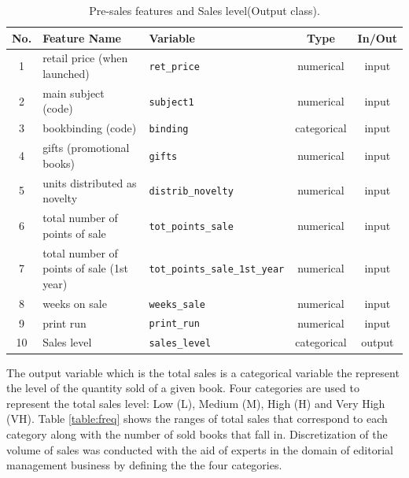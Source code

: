 \documentclass[a4paper,10pt,twocolumn,preprint,3p]{elsarticle}
\begin{document}
\begin{table}
\caption{Pre-sales features and Sales level(Output class). } 
\label{tabla:params_pre_sales}
\begin{center}
\begin{tabular}{|c|l|l|c|c|}
\hline 
No. & Feature Name & Variable & Type & In/Out\\
\hline 
1 & retail price (when launched) & \texttt{ret\_price} & numerical & input\\
2 & main subject (code) & \texttt{subject1} & numerical & input\\
3 & bookbinding (code) & \texttt{binding} & categorical & input\\
4 & gifts (promotional books) & \texttt{gifts} & numerical & input\\
5 & units distributed as novelty & \texttt{distrib\_novelty} & numerical & input\\
6 & total number of points of sale & \texttt{tot\_points\_sale} & numerical & input\\
7 & total number of points of sale (1st year) & \texttt{tot\_points\_sale\_1st\_year} & numerical & input\\
8 & weeks on sale & \texttt{weeks\_sale} & numerical & input\\
9 & print run & \texttt{print\_run} & numerical & input\\
\hline 
\hline
10 & Sales level & \texttt{sales\_level} & categorical & output\\
\hline 
\end{tabular}
\end{center}
\end{table}


The output variable which is the total sales is a categorical variable the represent the level of the quantity sold of a given book. Four categories are used to represent the total sales level: Low (L), Medium (M), High (H) and Very High (VH). Table \ref{table:freq} shows the ranges of total sales that correspond to each category along with the number of sold books that fall in. Discretization of the volume of sales was conducted with the aid of experts in the domain of editorial management business by defining the the four categories.

 
\end{document}
